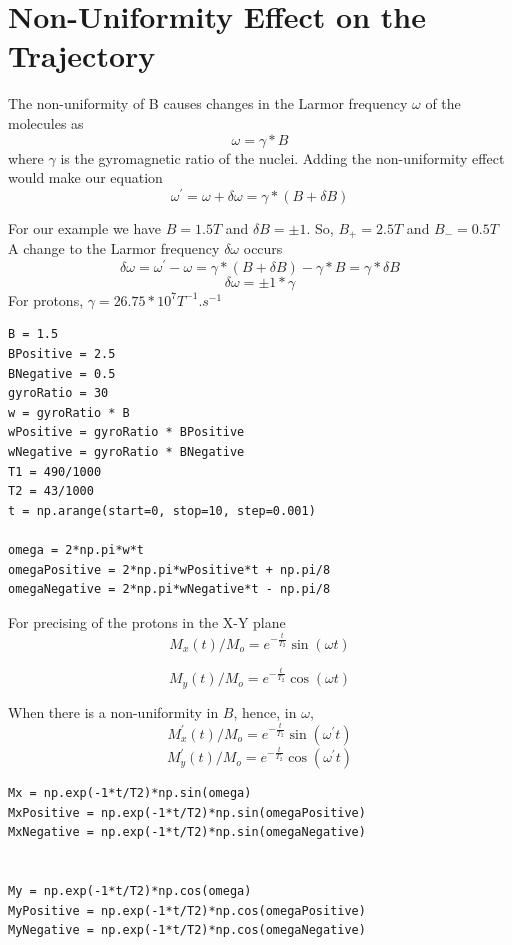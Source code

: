 \documentclass[18pt]{extarticle}
\begin{document}
\section{Non-Uniformity Effect on the Trajectory}
The non-uniformity of B causes changes in the Larmor frequency $\omega$ of the molecules as
\begin{equation*}
\omega = \gamma * B
\end{equation*}
where $\gamma$ is the gyromagnetic ratio of the nuclei.
Adding the non-uniformity effect would make our equation
\begin{equation*}
\omega ^{'} = \omega + \delta \omega = \gamma * (B + \delta B)
\end{equation*}

For our example we have $B = 1.5 T$ and $\delta B = \pm 1$. So, $B_+ = 2.5 T$ and $B_- = 0.5 T$
A change to the Larmor frequency $\delta \omega$ occurs
\begin{equation*}
\delta \omega = \omega ^{'} - \omega = \gamma * (B + \delta B) - \gamma * B = \gamma * \delta B
\end{equation*}
\begin{equation*}
\delta \omega = \pm 1 * \gamma
\end{equation*}
For protons, $\gamma = 26.75 * 10^7 T^{-1}.s^{-1}$
\newline
\begin{lstlisting}
B = 1.5
BPositive = 2.5
BNegative = 0.5
gyroRatio = 30
w = gyroRatio * B
wPositive = gyroRatio * BPositive
wNegative = gyroRatio * BNegative
T1 = 490/1000
T2 = 43/1000
t = np.arange(start=0, stop=10, step=0.001)

omega = 2*np.pi*w*t
omegaPositive = 2*np.pi*wPositive*t + np.pi/8
omegaNegative = 2*np.pi*wNegative*t - np.pi/8
\end{lstlisting}


For precising of the protons in the X-Y plane
\begin{equation*}
M_x(t) / M_o = e^{-\frac{t}{T_2}} \sin (\omega t)
\end{equation*}

\begin{equation*}
M_y(t) / M_o = e^{-\frac{t}{T_2}} \cos (\omega t)
\end{equation*}

When there is a non-uniformity in $B$, hence, in $\omega$,
\begin{equation*}
M_x^{'}(t) / M_o = e^{-\frac{t}{T_2}} \sin (\omega^{'} t)
\end{equation*}
\begin{equation*}
M_y^{'}(t) / M_o = e^{-\frac{t}{T_2}} \cos (\omega^{'} t)
\end{equation*}
\begin{lstlisting}
Mx = np.exp(-1*t/T2)*np.sin(omega)
MxPositive = np.exp(-1*t/T2)*np.sin(omegaPositive)
MxNegative = np.exp(-1*t/T2)*np.sin(omegaNegative)


My = np.exp(-1*t/T2)*np.cos(omega)
MyPositive = np.exp(-1*t/T2)*np.cos(omegaPositive)
MyNegative = np.exp(-1*t/T2)*np.cos(omegaNegative)
\end{lstlisting}
\end{document}
